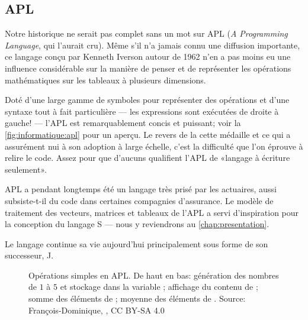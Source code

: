 \subsection{APL}
\label{sec:informatique:historique:apl}

Notre historique ne serait pas complet sans un mot sur APL
(\emph{A Programming Language}, qui l'aurait cru). Même s'il n'a
jamais connu une diffusion importante, ce langage conçu par Kenneth
Iverson autour de 1962 n'en a pas moins eu une influence considérable
sur la manière de penser et de représenter les opérations
mathématiques sur les tableaux à plusieurs dimensions.

Doté d'une large gamme de symboles pour représenter des opérations et
d'une syntaxe tout à fait particulière --- les expressions sont
exécutées de droite à gauche! --- l'APL est remarquablement concis et
puissant; voir la \autoref{fig:informatique:apl} pour un aperçu. Le
revers de la cette médaille et ce qui a assurément nui à son adoption
à large échelle, c'est la difficulté que l'on éprouve à relire le
code. Assez pour que d'aucuns qualifient l'APL de «langage à écriture
seulement».

APL a pendant longtemps été un langage très prisé par les actuaires,
aussi subsiste-t-il du code dans certaines compagnies d'assurance. Le
modèle de traitement des vecteurs, matrices et tableaux de l'APL a
servi d'inspiration pour la conception du langage S --- nous y
reviendrons au \autoref{chap:presentation}.

Le langage continue sa vie aujourd'hui principalement sous forme de son
successeur, J.

\begin{figure}
  \centering
  \caption[Opérations simples en APL.]{Opérations simples en APL. De
    haut en bas: génération des nombres de $1$ à $5$ et stockage dans
    la variable ; affichage du contenu de ; somme des
    éléments de ; moyenne des éléments de . {\small Source:
    François-Dominique,
    , CC BY-SA 4.0}}
  \label{fig:informatique:apl}
\end{figure}

